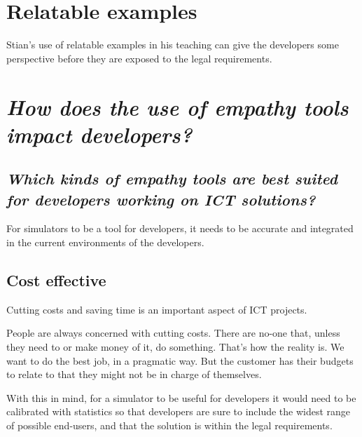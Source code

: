 \section{Relatable examples}
Stian's use of relatable examples in his teaching can give the developers some perspective before they are exposed to the legal requirements. 









\section{\textit{How does the use of empathy tools impact developers?}}


\subsection{\textit{Which kinds of empathy tools are best suited for developers working on ICT
solutions?}}
For simulators to be a tool for developers, it needs to be accurate and integrated in the current environments of the developers.

\subsection{Cost effective}
Cutting costs and saving time is an important aspect of ICT projects.

\begin{displayquote}
    People are always concerned with cutting costs. There are no-one that, unless they need to or make money of it, do something. That's how the reality is. We want to do the best job, in a pragmatic way. But the customer has their budgets to relate to that they might not be in charge of themselves.
\end{displayquote}
With this in mind, for a simulator to be useful for developers it would need to be calibrated with statistics so that developers are sure to include the widest range of possible end-users, and that the solution is within the legal requirements. 

